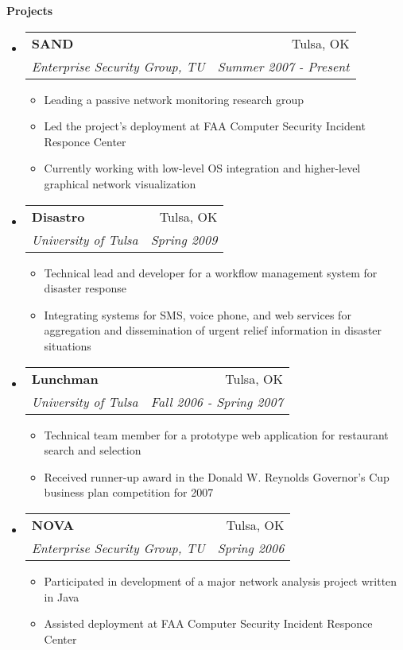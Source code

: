 \documentclass[letterpaper,11pt]{article}
\makeatletter
\newcommand{\resitem}[1]{\item #1 \vspace{-2pt}}
\newcommand{\resheading}[1]{{\large \colorbox{mygrey}{\begin{minipage}{\textwidth}{\textbf{#1 \vphantom{p\^{E}}}}\end{minipage}}}}
\newcommand{\ressubheading}[4]{
\begin{tabular*}{6.5in}{l@{\extracolsep{\fill}}r}
		\textbf{#1} & #2 \\
		\textit{#3} & \textit{#4} \\
\end{tabular*}\vspace{-6pt}}
\makeatother
\begin{document}
\resheading{Projects}
\begin{itemize}
\item
	\ressubheading{SAND}{Tulsa, OK}{Enterprise Security Group, TU}{Summer 2007 - Present}
	\begin{itemize}
		\resitem{Leading a passive network monitoring research group}
		\resitem{Led the project's deployment at FAA Computer Security Incident Responce Center}
		\resitem{Currently working with low-level OS integration and higher-level graphical network visualization}
	\end{itemize}
\item
	\ressubheading{Disastro}{Tulsa, OK}{University of Tulsa}{Spring 2009}
	\begin{itemize}
		\resitem{Technical lead and developer for a workflow management system for disaster response}
		\resitem{Integrating systems for SMS, voice phone, and web services for aggregation and dissemination of urgent relief information in disaster situations}
	\end{itemize}
\item
	\ressubheading{Lunchman}{Tulsa, OK}{University of Tulsa}{Fall 2006 - Spring 2007}
	\begin{itemize}
		\resitem{Technical team member for a prototype web application for restaurant search and selection}
		\resitem{Received runner-up award in the Donald W. Reynolds Governor's Cup business plan competition for 2007}
	\end{itemize}
\item
	\ressubheading{NOVA}{Tulsa, OK}{Enterprise Security Group, TU}{Spring 2006}
	\begin{itemize}
		\resitem{Participated in development of a major network analysis project written in Java}
		\resitem{Assisted deployment at FAA Computer Security Incident Responce Center}
	\end{itemize}
\end{itemize}
\end{document}
